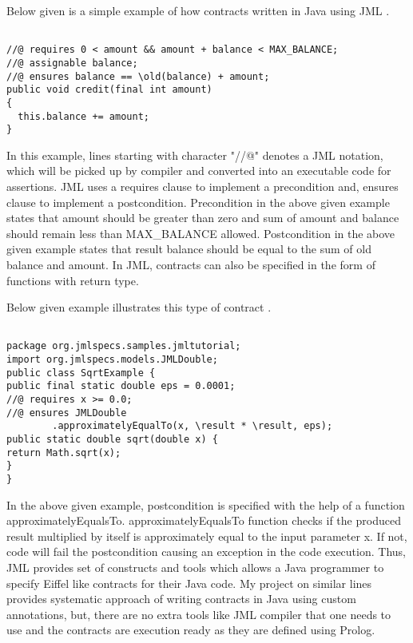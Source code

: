 \begin{minipage}{\linewidth}
Below given is a simple example of how contracts written in Java using JML \cite{JavaMode99:online}.

\lstset{language=Java, caption=JML Contract Example, captionpos=b, breaklines=true}       
\begin{lstlisting}[frame=single]

//@ requires 0 < amount && amount + balance < MAX_BALANCE;
//@ assignable balance;
//@ ensures balance == \old(balance) + amount;
public void credit(final int amount)
{
  this.balance += amount;
}

\end{lstlisting}
\end{minipage}

In this example, lines starting with character "//@" denotes a JML notation, which will be picked up by compiler and converted into an executable code for assertions.
JML uses a requires clause to implement a precondition and, ensures clause to implement a postcondition.
Precondition in the above given example states that amount should be greater than zero and sum of amount and balance should remain less than MAX\_BALANCE allowed.
Postcondition in the above given example states that result balance should be equal to the sum of old balance and amount.
In JML, contracts can also be specified in the form of functions with return type. 
\begin{minipage}{\linewidth}
Below given example illustrates this type of contract \cite{leavens2006design}.

\lstset{language=Java, caption=JML Contract Example with JML function, captionpos=b, breaklines=true}       
\begin{lstlisting}[frame=single]

package org.jmlspecs.samples.jmltutorial;
import org.jmlspecs.models.JMLDouble;
public class SqrtExample {
public final static double eps = 0.0001;
//@ requires x >= 0.0;
//@ ensures JMLDouble
		.approximatelyEqualTo(x, \result * \result, eps);
public static double sqrt(double x) {
return Math.sqrt(x);
}
}

\end{lstlisting}
\end{minipage}


In the above given example, postcondition is specified with the help of a function approximatelyEqualsTo. approximatelyEqualsTo function checks if the produced result multiplied by itself is approximately equal to the input parameter x. If not, code will fail the postcondition causing an exception in the code execution. \linebreak
Thus, JML provides set of constructs and tools which allows a Java programmer to specify Eiffel like contracts for their Java code. My project on similar lines provides systematic approach of writing contracts in Java using custom annotations, but, there are no extra tools like JML compiler that one needs to use and the contracts are execution ready as they are defined using Prolog.

